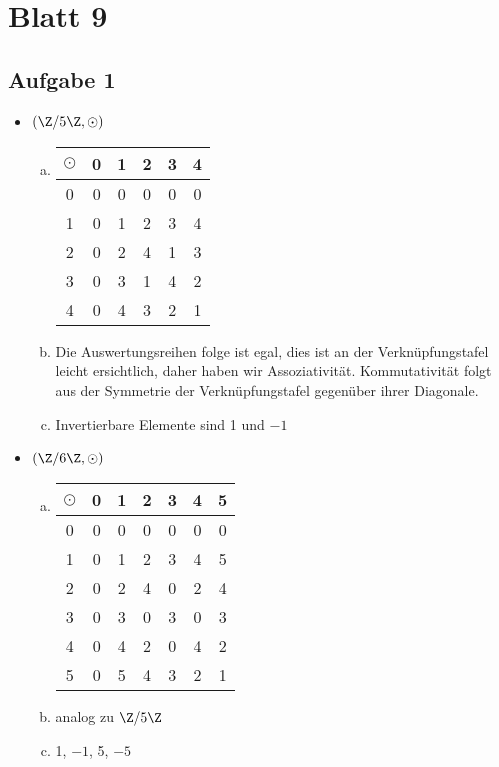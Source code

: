 \section*{Blatt 9}
%

\subsection*{Aufgabe 1}

\begin{itemize}
  \item $ (\Z / 5 \Z, \odot) $
  \begin{enumerate}[a)]
  \item
    \begin{tabular}{c|ccccc}
    $\odot$ & 0 & 1 & 2 & 3 & 4 \\
    \hline
    0 & 0 & 0 & 0 & 0 & 0 \\
    1 & 0 & 1 & 2 & 3 & 4 \\
    2 & 0 & 2 & 4 & 1 & 3 \\
    3 & 0 & 3 & 1 & 4 & 2 \\
    4 & 0 & 4 & 3 & 2 & 1 \\
    \end{tabular}
    \item Die Auswertungsreihen folge ist egal, dies ist an der Verknüpfungstafel leicht ersichtlich, daher haben wir Assoziativität. Kommutativität folgt aus der Symmetrie der Verknüpfungstafel gegenüber ihrer Diagonale.

    \item Invertierbare Elemente sind 1 und $-1$

    \end{enumerate}



  \item $ (\Z / 6 \Z, \odot) $
  \begin{enumerate}[a)]
  \item
  \begin{tabular}{c|cccccc}
    $\odot$ & 0 & 1 & 2 & 3 & 4 & 5\\
    \hline
    0 & 0 & 0 & 0 & 0 & 0 & 0 \\
    1 & 0 & 1 & 2 & 3 & 4 & 5 \\
    2 & 0 & 2 & 4 & 0 & 2 & 4 \\
    3 & 0 & 3 & 0 & 3 & 0 & 3 \\
    4 & 0 & 4 & 2 & 0 & 4 & 2 \\
    5 & 0 & 5 & 4 & 3 & 2 & 1 \\

    \end{tabular}

    \item analog zu $\Z / 5\Z$

    \item 1, $-1$, 5, $-5$


    \end{enumerate}


\end{itemize}

